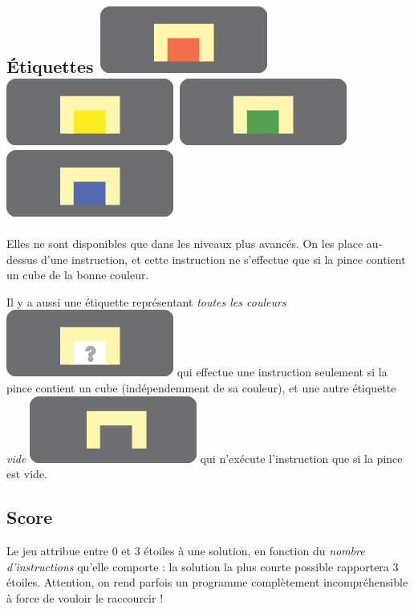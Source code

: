 \documentclass[a4paper,11pt]{article}
\begin{document}
\subsection*{\'Etiquettes   \includegraphics[width =.5cm]{red} \includegraphics[width
    =.5cm]{yellow} \includegraphics[width =.5cm]{green}
 \includegraphics[width =.5cm]{blue}
}

Elles ne sont disponibles que dans les niveaux plus avancés. On les
place au-dessus d'une instruction, et cette instruction ne s'effectue
que si la pince contient un cube de la bonne couleur.

Il y a aussi une \'etiquette
  repr\'esentant {\it toutes les couleurs} \includegraphics[width
    =.5cm]{any} qui effectue une instruction seulement si
  la pince contient un cube (ind\'ependemment de sa couleur), et
  une autre \'etiquette {\it vide} \includegraphics[width
    =.5cm]{none} qui n'ex\'ecute l'instruction que si la pince est
  vide.


\subsection*{Score}

Le jeu attribue entre 0 et 3 étoiles à une solution, en fonction du
\emph{nombre d'instructions} qu'elle comporte : la solution la plus
courte possible rapportera 3 étoiles.
%
Attention, on rend parfois un programme complètement incompréhensible
à force de vouloir le raccourcir !
\end{document}
